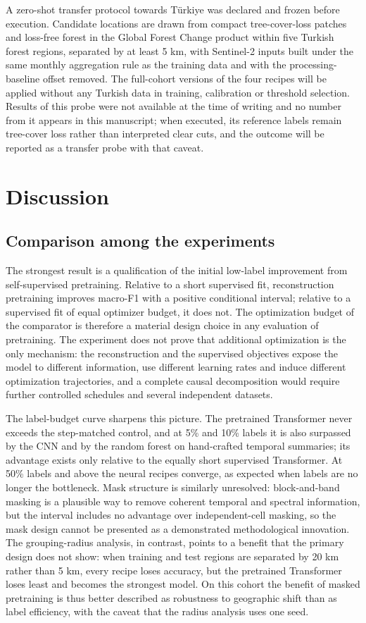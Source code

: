 \documentclass[10pt,a4paper,twocolumn]{article}
\begin{document}
A zero-shot transfer protocol towards Türkiye was declared and frozen before execution. Candidate locations are drawn from compact tree-cover-loss patches and loss-free forest in the Global Forest Change product \cite{ref17} within five Turkish forest regions, separated by at least 5 km, with Sentinel-2 inputs built under the same monthly aggregation rule as the training data and with the processing-baseline offset removed. The full-cohort versions of the four recipes will be applied without any Turkish data in training, calibration or threshold selection. Results of this probe were not available at the time of writing and no number from it appears in this manuscript; when executed, its reference labels remain tree-cover loss rather than interpreted clear cuts, and the outcome will be reported as a transfer probe with that caveat.

\section{Discussion}
\subsection{Comparison among the experiments}
The strongest result is a qualification of the initial low-label improvement from self-supervised pretraining. Relative to a short supervised fit, reconstruction pretraining improves macro-F1 with a positive conditional interval; relative to a supervised fit of equal optimizer budget, it does not. The optimization budget of the comparator is therefore a material design choice in any evaluation of pretraining. The experiment does not prove that additional optimization is the only mechanism: the reconstruction and the supervised objectives expose the model to different information, use different learning rates and induce different optimization trajectories, and a complete causal decomposition would require further controlled schedules and several independent datasets.

The label-budget curve sharpens this picture. The pretrained Transformer never exceeds the step-matched control, and at 5\% and 10\% labels it is also surpassed by the CNN and by the random forest on hand-crafted temporal summaries; its advantage exists only relative to the equally short supervised Transformer. At 50\% labels and above the neural recipes converge, as expected when labels are no longer the bottleneck. Mask structure is similarly unresolved: block-and-band masking is a plausible way to remove coherent temporal and spectral information, but the interval includes no advantage over independent-cell masking, so the mask design cannot be presented as a demonstrated methodological innovation. The grouping-radius analysis, in contrast, points to a benefit that the primary design does not show: when training and test regions are separated by 20 km rather than 5 km, every recipe loses accuracy, but the pretrained Transformer loses least and becomes the strongest model. On this cohort the benefit of masked pretraining is thus better described as robustness to geographic shift than as label efficiency, with the caveat that the radius analysis uses one seed.
\end{document}
